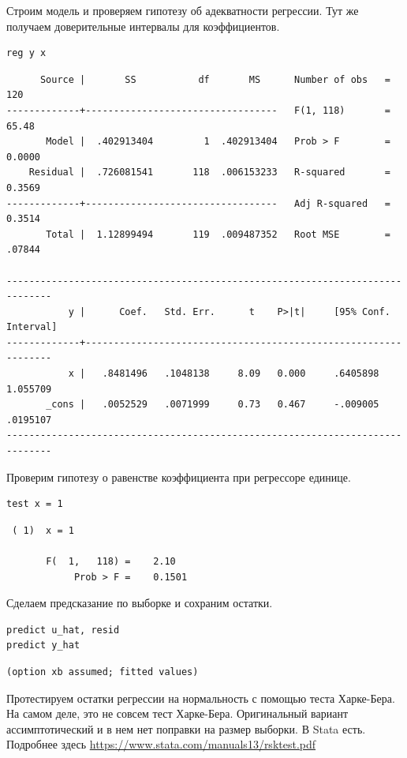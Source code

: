 \documentclass[]{book}
\begin{document}
Строим модель и проверяем гипотезу об адекватности регрессии. Тут же получаем доверительные интервалы для коэффициентов.

\begin{verbatim}
reg y x
\end{verbatim}

\begin{verbatim}
      Source |       SS           df       MS      Number of obs   =       120
-------------+----------------------------------   F(1, 118)       =     65.48
       Model |  .402913404         1  .402913404   Prob > F        =    0.0000
    Residual |  .726081541       118  .006153233   R-squared       =    0.3569
-------------+----------------------------------   Adj R-squared   =    0.3514
       Total |  1.12899494       119  .009487352   Root MSE        =    .07844

------------------------------------------------------------------------------
           y |      Coef.   Std. Err.      t    P>|t|     [95% Conf. Interval]
-------------+----------------------------------------------------------------
           x |   .8481496   .1048138     8.09   0.000     .6405898    1.055709
       _cons |   .0052529   .0071999     0.73   0.467     -.009005    .0195107
------------------------------------------------------------------------------
\end{verbatim}

Проверим гипотезу о равенстве коэффициента при регрессоре единице.

\begin{verbatim}
test x = 1
\end{verbatim}

\begin{verbatim}
 ( 1)  x = 1

       F(  1,   118) =    2.10
            Prob > F =    0.1501
\end{verbatim}

Сделаем предсказание по выборке и сохраним остатки.

\begin{verbatim}
predict u_hat, resid
predict y_hat
\end{verbatim}

\begin{verbatim}
(option xb assumed; fitted values)
\end{verbatim}

Протестируем остатки регрессии на нормальность с помощью теста Харке-Бера.
На самом деле, это не совсем тест Харке-Бера. Оригинальный вариант ассимптотический и в нем нет поправки на размер выборки. В Stata есть. Подробнее здесь \url{https://www.stata.com/manuals13/rsktest.pdf}
\end{document}
